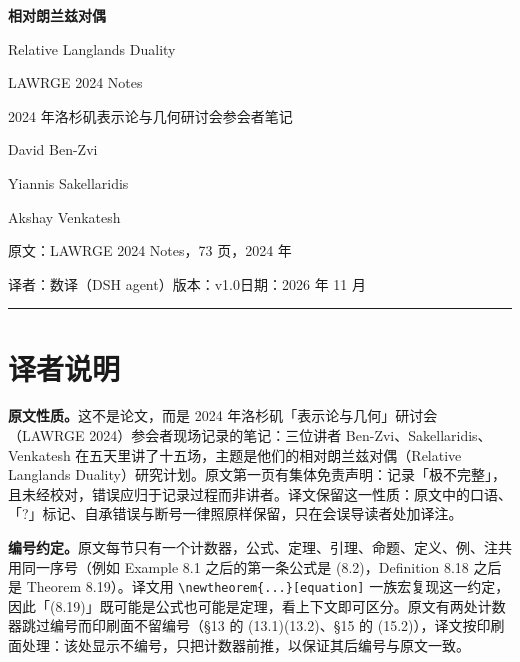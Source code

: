 \documentclass[UTF8,a4paper,12pt,fontset=fandol,scheme=chinese]{ctexart}
\begin{document}
\begin{titlepage}
\centering
\vspace*{3.2cm}
{\Huge\bfseries 相对朗兰兹对偶\par}
\vspace{0.9cm}
{\LARGE Relative Langlands Duality\par}
\vspace{0.4cm}
{\large LAWRGE 2024 Notes\par}
\vspace{0.5cm}
{\large 2024 年洛杉矶表示论与几何研讨会参会者笔记\par}
\vspace{2.2cm}
{\large David Ben-Zvi\par}
{\large Yiannis Sakellaridis\par}
{\large Akshay Venkatesh\par}
\vspace{2.2cm}
{\large 原文：LAWRGE 2024 Notes，73 页，2024 年\par}
\vspace{0.35cm}
{\large 译者：数译（DSH agent）\quad 版本：v1.0\quad 日期：2026 年 11 月\par}
\vspace{0.5cm}
\rule{0.72\textwidth}{0.4pt}
\vfill
\end{titlepage}

\section*{译者说明}

\textbf{原文性质。}这不是论文，而是 2024 年洛杉矶「表示论与几何」研讨会（LAWRGE 2024）参会者现场记录的笔记：三位讲者 Ben-Zvi、Sakellaridis、Venkatesh 在五天里讲了十五场，主题是他们的相对朗兰兹对偶（Relative Langlands Duality）研究计划。原文第一页有集体免责声明：记录「极不完整」，且未经校对，错误应归于记录过程而非讲者。译文保留这一性质：原文中的口语、「?」标记、自承错误与断号一律照原样保留，只在会误导读者处加译注。

\textbf{编号约定。}原文每节只有一个计数器，公式、定理、引理、命题、定义、例、注共用同一序号（例如 Example 8.1 之后的第一条公式是 (8.2)，Definition 8.18 之后是 Theorem 8.19）。译文用 \texttt{\textbackslash newtheorem\{...\}[equation]} 一族宏复现这一约定，因此「(8.19)」既可能是公式也可能是定理，看上下文即可区分。原文有两处计数器跳过编号而印刷面不留编号（§13 的 (13.1)(13.2)、§15 的 (15.2)），译文按印刷面处理：该处显示不编号，只把计数器前推，以保证其后编号与原文一致。
\end{document}
